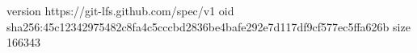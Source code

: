 version https://git-lfs.github.com/spec/v1
oid sha256:45c12342975482c8fa4c5cccbd2836be4bafe292e7d117df9cf577ec5ffa626b
size 166343
